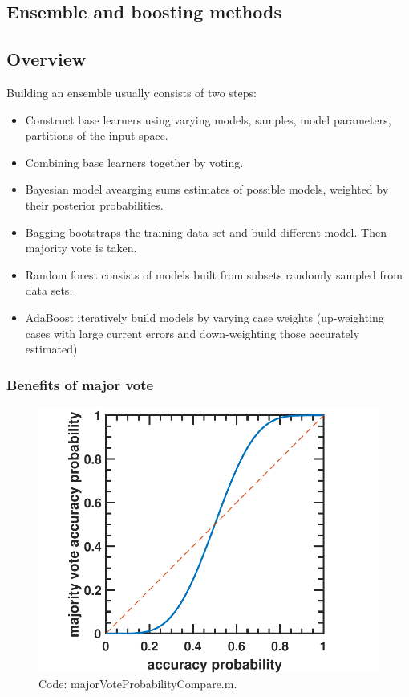 \begin{refsection}
	\startcontents[chapters]
\chapter{Ensemble and boosting methods}

\section{Overview}



Building an ensemble usually consists of two steps:
\begin{itemize}
	\item Construct base learners using varying models, samples, model parameters, partitions of the input space.
	\item Combining base learners together by voting.
\end{itemize}


\begin{remark}\cite[5]{seni2010ensemble}
	
\end{remark}
\begin{itemize}
	\item Bayesian model avearging sums estimates of possible models, weighted by their posterior probabilities.
	\item Bagging bootstraps the training data set and build different model. Then majority vote is taken.
	\item Random forest consists of models built from subsets randomly sampled from data sets. 
	\item AdaBoost iteratively build models by varying case weights (up-weighting cases with large current errors and down-weighting those accurately estimated) 
\end{itemize}


\subsection{Benefits of major vote}

\begin{figure}
\centering
\includegraphics[width=0.6\linewidth]{../figures/statisticalLearning/ensembleMethods/majorVoteAccuracyProbabilityVsSingleVote}
\caption{Code: majorVoteProbabilityCompare.m. }
\label{fig:majorVoteAccuracyProbabilityVsSingleVote}
\end{figure}


\end{refsection}
